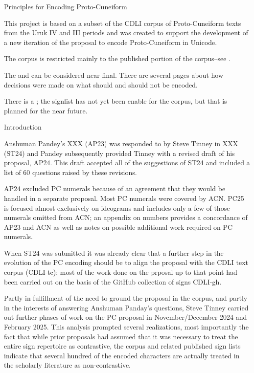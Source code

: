 \Hh{}Principles for Encoding Proto-Cuneiform


\par This project is based on a subset of the CDLI corpus of
      Proto-Cuneiform texts from the Uruk IV and III periods and was
      created to support the development of a new iteration of the
      proposal to encode Proto-Cuneiform in Unicode.


\par The corpus is restricted mainly to the published portion of
      the corpus--see .


\par The  and can be considered near-final.  There are
      several pages about how decisions were made on what should and
      should not be encoded.


\par There is a ; the signlist has not yet been enable for the
      corpus, but that is planned for the near future.

\Hh{}Introduction


\par Anshuman Pandey's XXX (AP23) was responded to by Steve Tinney
      in XXX (ST24) and Pandey subsequently provided Tinney with a
      revised draft of his proposal, AP24. This draft accepted all of
      the suggestions of ST24 and included a list of 60 questions
      raised by these revisions.


\par AP24 excluded PC numerals because of an agreement that they
      would be handled in a separate proposal.  Most PC numerals were
      covered by ACN.  PC25 is focused almost exclusively on ideograms
      and includes only a few of those numerals omitted from ACN; an
      appendix on numbers provides a concordance of AP23 and ACN as
      well as notes on possible additional work required on PC
      numerals.


\par When ST24 was submitted it was already clear that a further
      step in the evolution of the PC encoding should be to align the
      proposal with the CDLI text corpus (CDLI-tc); most of the work
      done on the prposal up to that point had been carried out on the
      basis of the GitHub collection of signs CDLI-gh.


\par Partly in fulfillment of the need to ground the proposal in
      the corpus, and partly in the interests of answering Anshuman
      Panday's questions, Steve Tinney carried out further phases of
      work on the PC proposal in November/December 2024 and February
      2025.  This analysis prompted several realizations, most importantly
      the fact that while prior proposals had assumed that it was
      necessary to treat the entire sign repertoire as contrastive,
      the corpus and related published sign lists indicate that
      several hundred of the encoded characters are actually treated
      in the scholarly literature as non-contrastive.


